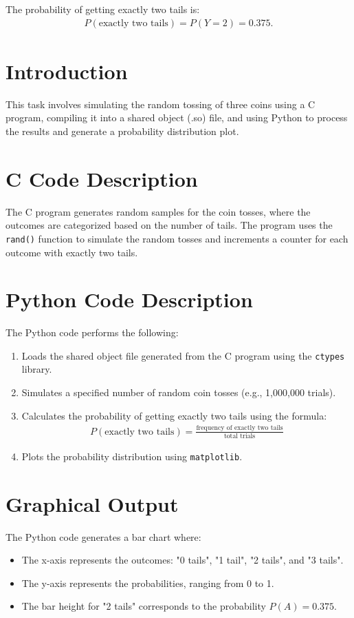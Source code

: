 \documentclass[journal]{IEEEtran}
\begin{document}
The probability of getting exactly two tails is:
\begin{align}
    P(\text{exactly two tails}) = P(Y = 2) = 0.375.
\end{align}

\section*{Introduction}
This task involves simulating the random tossing of three coins using a C program, compiling it into a shared object (.so) file, and using Python to process the results and generate a probability distribution plot.

\section*{C Code Description}
The C program generates random samples for the coin tosses, where the outcomes are categorized based on the number of tails. The program uses the \texttt{rand()} function to simulate the random tosses and increments a counter for each outcome with exactly two tails.

\section*{Python Code Description}
The Python code performs the following:
\begin{enumerate}
    \item Loads the shared object file generated from the C program using the \texttt{ctypes} library.
    \item Simulates a specified number of random coin tosses (e.g., 1,000,000 trials).
    \item Calculates the probability of getting exactly two tails using the formula:
    \begin{align}
    P(\text{exactly two tails}) = \frac{\text{frequency of exactly two tails}}{\text{total trials}}
    \end{align}
    \item Plots the probability distribution using \texttt{matplotlib}.
\end{enumerate}

\section*{Graphical Output}
The Python code generates a bar chart where:
\begin{itemize}
    \item The x-axis represents the outcomes: "0 tails", "1 tail", "2 tails", and "3 tails".
    \item The y-axis represents the probabilities, ranging from 0 to 1.
    \item The bar height for "2 tails" corresponds to the probability $P(A) = 0.375$.
\end{itemize}
\end{document}
